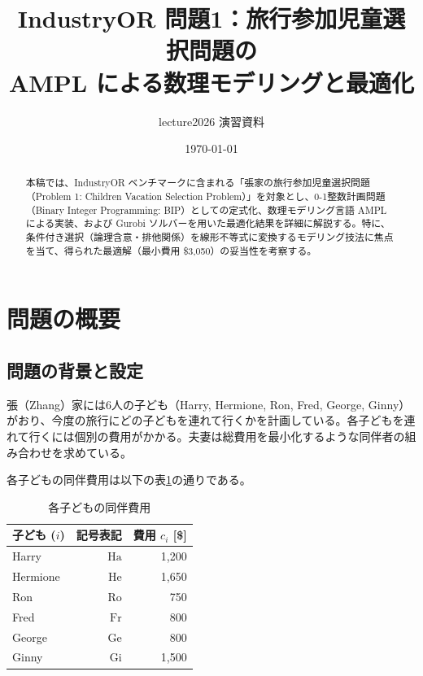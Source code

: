 \documentclass[11pt,a4paper]{ltjsarticle}
\title{\textbf{IndustryOR 問題1：旅行参加児童選択問題の\\AMPL による数理モデリングと最適化}}
\author{lecture2026 演習資料}
\date{\today}
\begin{document}
\maketitle

\begin{abstract}
本稿では、IndustryOR ベンチマークに含まれる「張家の旅行参加児童選択問題（Problem 1: Children Vacation Selection Problem）」を対象とし、0-1整数計画問題（Binary Integer Programming: BIP）としての定式化、数理モデリング言語 AMPL による実装、および Gurobi ソルバーを用いた最適化結果を詳細に解説する。特に、条件付き選択（論理含意・排他関係）を線形不等式に変換するモデリング技法に焦点を当て、得られた最適解（最小費用 \$3,050）の妥当性を考察する。
\end{abstract}

\section{問題の概要}

\subsection{問題の背景と設定}
張（Zhang）家には6人の子ども（Harry, Hermione, Ron, Fred, George, Ginny）がおり、今度の旅行にどの子どもを連れて行くかを計画している。各子どもを連れて行くには個別の費用がかかる。夫妻は総費用を最小化するような同伴者の組み合わせを求めている。

各子どもの同伴費用は以下の表\ref{tab:children_costs}の通りである。

\begin{table}[htbp]
  \centering
  \caption{各子どもの同伴費用}
  \label{tab:children_costs}
  \begin{tabular}{lrr}
    \toprule
    子ども ($i$) & 記号表記 & 費用 $c_i$ [\$] \\
    \midrule
    Harry & $\text{Ha}$ & 1,200 \\
    Hermione & $\text{He}$ & 1,650 \\
    Ron & $\text{Ro}$ & 750 \\
    Fred & $\text{Fr}$ & 800 \\
    George & $\text{Ge}$ & 800 \\
    Ginny & $\text{Gi}$ & 1,500 \\
    \bottomrule
  \end{tabular}
\end{table}
\end{document}
